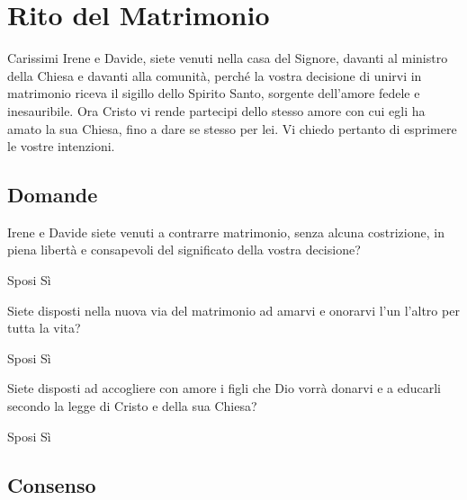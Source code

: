 
\section*{Rito del Matrimonio}

\begin{dialoghi}
\item[\sacerdote] Carissimi Irene e Davide, siete venuti nella casa del Signore, davanti al ministro della Chiesa e davanti alla comunità, perché la vostra decisione di unirvi in matrimonio riceva il sigillo dello Spirito Santo, sorgente dell'amore fedele e inesauribile. Ora Cristo vi rende partecipi dello stesso amore con cui egli ha amato la sua Chiesa, fino a dare se stesso per lei. Vi chiedo pertanto di esprimere le vostre intenzioni.
\end{dialoghi}

\subsection*{Domande}

\begin{dialoghi}
\item[\sacerdote] Irene e Davide siete venuti a contrarre matrimonio, senza alcuna costrizione, in piena libertà e consapevoli del significato della vostra decisione?
\item[Sposi] Sì
\item[\sacerdote] Siete disposti nella nuova via del matrimonio ad amarvi e onorarvi l'un l'altro per tutta la vita?
\item[Sposi] Sì
\item[\sacerdote] Siete disposti ad accogliere con amore i figli che Dio vorrà donarvi e a educarli secondo la legge di Cristo e della sua Chiesa?
\item[Sposi] Sì
\end{dialoghi}

\subsection*{Consenso}

